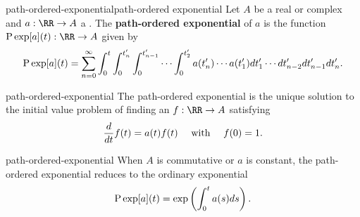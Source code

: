 \begin{topic}{path-ordered-exponential}{path-ordered exponential}
    Let $A$ be a real or complex  and $a : \RR \to A$ a . The \textbf{path-ordered exponential} of $a$ is the function $\textup{P} \exp [a](t) : \RR \to A$ given by
    \[ \textup{P} \exp [a] (t) = \sum_{n = 0}^\infty \int_0^t \int_0^{t'_n} \int_0^{t'_{n - 1}} \cdots \int_0^{t'_2} a(t'_n) \cdots a(t'_1) d t'_1 \cdots d t'_{n - 2} d t'_{n - 1} d t'_n . \]
\end{topic}

\begin{example}{path-ordered-exponential}
    The path-ordered exponential is the unique solution to the initial value problem of finding an $f : \RR \to A$ satisfying
    \[ \frac{d}{dt} f(t) = a(t) f(t) \quad \textup{ with } \quad f(0) = 1 . \]
\end{example}

\begin{example}{path-ordered-exponential}
    When $A$ is commutative or $a$ is constant, the path-ordered exponential reduces to the ordinary exponential
    \[ \textup{P} \exp[a](t) = \exp \left( \int_0^t a(s) ds \right) . \]
\end{example}